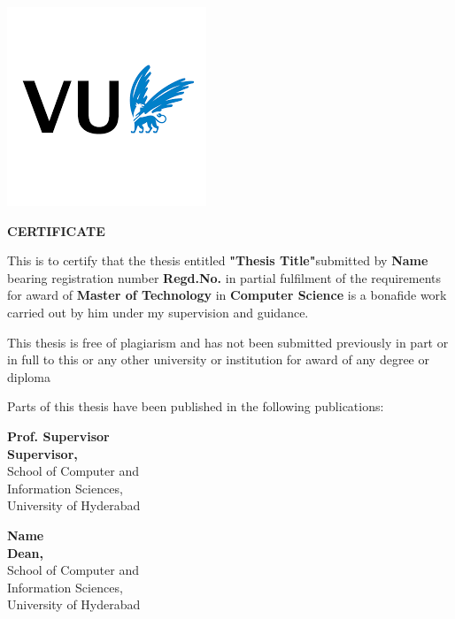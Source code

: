 \newpage
\thispagestyle{empty}
\begin{center}
    
\centerline{\includegraphics[width=0.30\linewidth]{images/download.png}}
\vspace{0.3 in}


			    
  {\Large\bf CERTIFICATE}
     \vspace{0.5 in}
\end{center}

 
This is to certify that the thesis entitled \textbf{"Thesis Title"}submitted by \textbf{Name} bearing registration number \textbf{Regd.No.} in partial fulfilment of the requirements for award of\textbf{ Master of Technology} in  \textbf{ Computer Science} is a bonafide work carried out by him under my supervision and guidance.

This thesis is free of plagiarism and has not been submitted previously in part or in full to this or any other university or institution for award of any degree or diploma

Parts of this thesis have been published in the following publications: 
 
 
  
 \vspace{5mm}
  \parbox[t]{80mm}{ \vspace{25mm}
 {\large \bf Prof. Supervisor}\\
  {\bf Supervisor,}\\
 School of Computer and\\
 Information Sciences,\\ University of Hyderabad
  }\hfill
  \parbox[t]{80mm}{ \vspace{25mm}
 {\large \bf Name}\\
 {\bf Dean,}\\
School of Computer and\\ Information Sciences,\\ University of Hyderabad
   }
\setcounter{page}{0}
